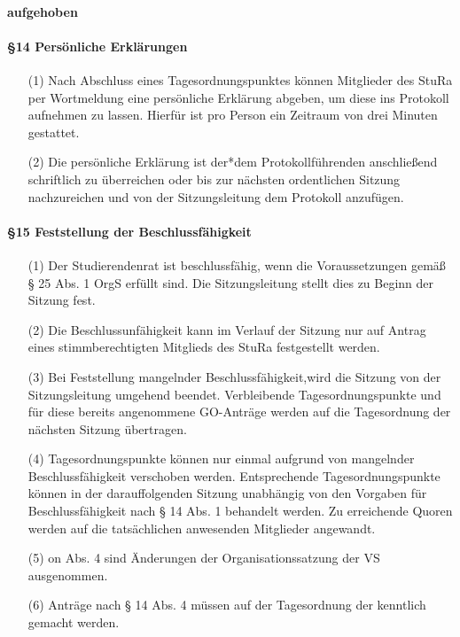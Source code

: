         \paragraph{aufgehoben}
        \paragraph{§14 Persönliche Erklärungen}
            \begin{itemize}
                \item[(1)] Nach Abschluss eines Tagesordnungspunktes können Mitglieder des StuRa per Wortmeldung eine persönliche Erklärung abgeben, um diese ins Protokoll aufnehmen zu lassen. Hierfür ist pro Person ein Zeitraum von drei Minuten gestattet.
                \item[(2)] Die persönliche Erklärung ist der*dem Protokollführenden anschließend schriftlich zu überreichen oder bis zur nächsten ordentlichen Sitzung nachzureichen und von der Sitzungsleitung dem Protokoll anzufügen.
            \end{itemize}
        \paragraph{§15 Feststellung der Beschlussfähigkeit}
            \begin{itemize}
                \item[(1)] Der Studierendenrat ist beschlussfähig, wenn die Voraussetzungen gemäß § 25 Abs. 1 OrgS erfüllt sind. Die Sitzungsleitung stellt dies zu Beginn der Sitzung fest.
                \item[(2)] Die Beschlussunfähigkeit kann im Verlauf der Sitzung nur auf Antrag eines stimmberechtigten Mitglieds des StuRa festgestellt werden.
                \item[(3)] Bei Feststellung mangelnder Beschlussfähigkeit,wird die Sitzung von der Sitzungsleitung umgehend beendet. Verbleibende Tagesordnungspunkte und für diese bereits angenommene GO-Anträge werden auf die Tagesordnung der nächsten Sitzung übertragen. 
                \item[(4)] Tagesordnungspunkte können nur einmal aufgrund von mangelnder Beschlussfähigkeit verschoben werden. Entsprechende Tagesordnungspunkte können in der darauffolgenden Sitzung unabhängig von den Vorgaben für Beschlussfähigkeit nach § 14 Abs. 1 behandelt werden. Zu erreichende Quoren werden auf die tatsächlichen anwesenden Mitglieder angewandt.
                \item[(5)] on Abs. 4 sind Änderungen der Organisationssatzung der VS ausgenommen.
                \item[(6)] Anträge nach § 14 Abs. 4 müssen auf der Tagesordnung der kenntlich gemacht werden.
            \end{itemize}

